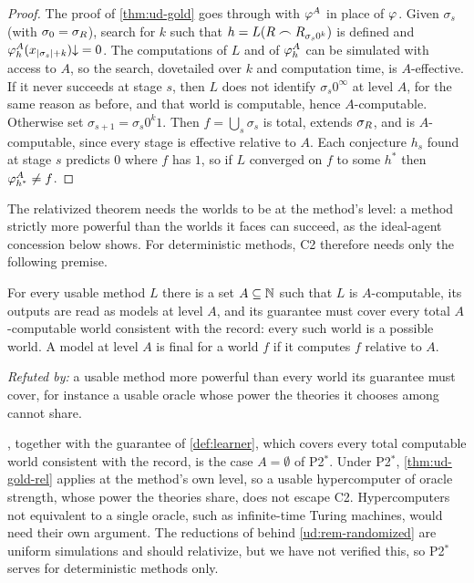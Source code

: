 \begin{proof}
The proof of \cref{thm:ud-gold} goes through with $\varphi_{}^A$ in place of $\varphi_{}$. Given
$\sigma_s$ (with $\sigma_0=\sigma_R$), search for $k$ such that
$h=L(R\frown R_{\sigma_s0^k})$ is defined and $\varphi_{h}^A(x_{|\sigma_s|+k})\mathord{\downarrow}=0$.
The computations of $L$ and of $\varphi_{h}^A$ can be simulated with access to $A$, so the
search, dovetailed over $k$ and computation time, is $A$-effective. If it never
succeeds at stage $s$, then $L$ does not identify $\sigma_s0^\infty$ at level $A$, for
the same reason as before, and that world is computable, hence $A$-computable.
Otherwise set $\sigma_{s+1}=\sigma_s0^k1$. Then $f=\bigcup_s\sigma_s$ is total, extends
$\sigma_R$, and is $A$-computable, since every stage is effective relative to $A$.
Each conjecture $h_s$ found at stage $s$ predicts $0$ where $f$ has $1$, so if $L$
converged on $f$ to some $h^*$ then $\varphi_{h^*}^A\ne f$.
\end{proof}

The relativized theorem needs the worlds to be at the method's level: a method strictly
more powerful than the worlds it faces can succeed, as the ideal-agent concession below
shows. For deterministic methods, C2 therefore needs only the following premise.

\begingroup
\renewcommand{\thepremise}{P2$^{*}$}%
\renewcommand{\theHpremise}{P2star}%
\addtocounter{premise}{-1}%
\begin{premise}\label{rem:p2star}
For every usable method $L$ there is a set $A\subseteq\mathbb{N}$ such that $L$ is $A$-computable, its outputs are read as models at level $A$, and its guarantee must cover every total $A$-computable world consistent with the record: every such world is a possible world. A model at level $A$ is final for a world $f$ if it computes $f$ relative to $A$.
\end{premise}
\endgroup

\noindent\emph{Refuted by:} a usable method more powerful than every world its guarantee
must cover, for instance a usable oracle whose power the theories it chooses among
cannot share.

, together with the guarantee of \cref{def:learner}, which covers
every total computable world consistent with the record, is the case $A=\emptyset$ of
P2$^{*}$. Under P2$^{*}$, \cref{thm:ud-gold-rel} applies at the method's own level, so
a usable hypercomputer of oracle strength, whose power the theories share, does not
escape C2. Hypercomputers not equivalent to a single oracle, such as infinite-time
Turing machines, would need their own argument. The
reductions of \citet{pitt1989} behind \cref{ud:rem-randomized} are uniform simulations
and should relativize, but we have not verified this, so P2$^{*}$ serves for
deterministic methods only.

